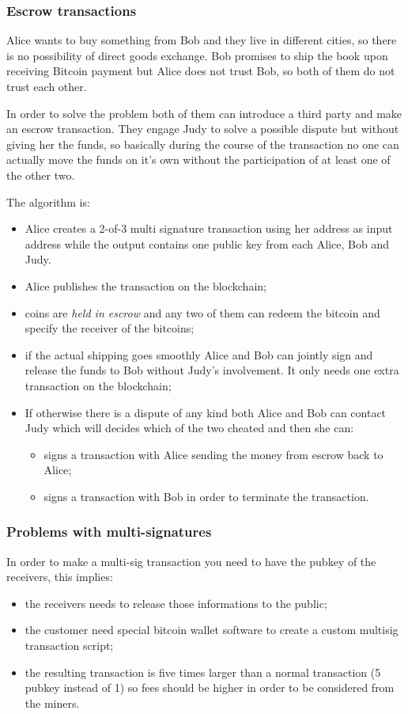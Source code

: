 \subsubsection{Escrow transactions}
Alice wants to buy something from Bob and they live in different cities, so there is no possibility of direct goods exchange.
Bob promises to ship the book upon receiving Bitcoin payment but Alice does not trust Bob, so both of them do not trust each other.

In order to solve the problem both of them can introduce a third party and make an escrow transaction.
They engage Judy to solve a possible dispute but without giving her the funds, so basically during the course of the transaction no one can actually move the funds on it's own without the participation of at least one of the other two.

The algorithm is:
\begin{itemize}
    \item Alice creates a 2-of-3 multi signature transaction using her address as input address while the output contains one public key from each Alice, Bob and Judy.
    \item Alice publishes the transaction on the blockchain;
    \item coins are \emph{held in escrow} and any two of them can redeem the bitcoin and specify the receiver of the bitcoins;

    \item if the actual shipping goes smoothly Alice and Bob can jointly sign and release the funds to Bob without Judy's involvement.
    It only needs one extra transaction on the blockchain;
    \item If otherwise there is a dispute of any kind both Alice and Bob can contact Judy which will decides which of the two cheated and then she can:
    \begin{itemize}
        \item signs a transaction with Alice sending the money from escrow back to Alice;
        \item signs a transaction with Bob in order to terminate the transaction.
    \end{itemize}
\end{itemize}

\subsubsection{Problems with multi-signatures}
In order to make a multi-sig transaction you need to have the pubkey of the receivers, this implies:
\begin{itemize}
    \item the receivers needs to release those informations to the public;
    \item the customer need special bitcoin wallet software to create a custom multisig transaction script;
    \item the resulting transaction is five times larger than a normal transaction (5 pubkey instead of 1) so fees should be higher in order to be considered from the miners.
\end{itemize}

